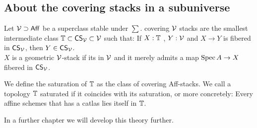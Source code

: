 \subsection{About the covering stacks in a subuniverse}
\begin{definition}
	Let $\mathcal{V} \supset \mathsf{Aff}$ be a superclass stable under $\sum$. covering $\mathcal{V}$ stacks are the smallest intermediate class $\mathbb{T} \subset \mathsf{CS}_{\mathcal{V}} \subset \mathcal{V}$ such that: If $X : \mathbb{T}$ ,  $Y : \mathcal{V}$ and $X \to Y$ is fibered in $\mathsf{CS}_{\mathcal{V}}$, then $Y \in \mathsf{CS}_{\mathcal{V}}$. \\
	$X$ is a geometric $\mathcal{V}$-stack if its in $\mathcal{V}$ and it merely admits a map $\operatorname{Spec} A \to X$ fibered in $\mathsf{CS}_{\mathcal{V}}$.
\end{definition}
\begin{definition}
	We define the saturation of $\mathbb{T}$ as the class of covering Aff-stacks. We call a topology $\mathbb{T}$ saturated if it coincides with its saturation, or more concretely: Every affine schemes that has a catlas lies itself in $\mathbb{T}$. \\ 
\end{definition}
In a further chapter we will develop this theory further.



